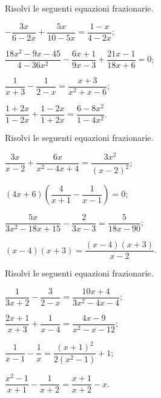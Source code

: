 \begin{esercizio}[\Ast]
\label{ese:18.8}
Risolvi le seguenti equazioni frazionarie.
\begin{multicols}{2}
\begin{enumeratea}
 \item $-{\dfrac{3x}{6-2x}}+\dfrac{5x}{10-5x}=\dfrac{1-x}{4-2x}$;
 \item $\dfrac{18x^{2}-9x-45}{4-36x^{2}}-\dfrac{6x+1}{9x-3}+\dfrac{21x-1}{18x+6}=0$;
 \item $\dfrac{1}{x+3}-\dfrac{1}{2-x}=\dfrac{x+3}{x^{2}+x-6}$;
 \item $\dfrac{1+2x}{1-2x}+\dfrac{1-2x}{1+2x}=\dfrac{6-8x^{2}}{1-4x^{2}}$.
\end{enumeratea}
\end{multicols}
\end{esercizio}

\begin{esercizio}[\Ast]
\label{ese:18.9}
Risolvi le seguenti equazioni frazionarie.
\begin{multicols}{2}
\begin{enumeratea}
 \item $\dfrac{3x}{x-2}+\dfrac{6x}{x^{2}-4x+4}=\dfrac{3x^{2}}{(x-2)^{2}}$;
 \item $(4x+6)\left(\dfrac{4}{x+1}-\dfrac{1}{x-1}\right)=0$;
 \item $\dfrac{5x}{3x^{2}-18x+15}-\dfrac{2}{3x-3}=\dfrac{5}{18x-90}$;
 \item $(x-4)(x+3)=\dfrac{(x-4)(x+3)}{x-2}$.
\end{enumeratea}
\end{multicols}
\end{esercizio}

\begin{esercizio}[\Ast]
\label{ese:18.10}
Risolvi le seguenti equazioni frazionarie.
\begin{multicols}{2}
\begin{enumeratea}
 \item $\dfrac{1}{3x+2}-\dfrac{3}{2-x}=\dfrac{10x+4}{3x^{2}-4x-4}$;
 \item $\dfrac{2x+1}{x+3}+\dfrac{1}{x-4}=\dfrac{4x-9}{x^{2}-x-12}$;
 \item $\dfrac{1}{x-1}-\dfrac{1}{x}=\dfrac{(x+1)^{2}}{2(x^{2}-1)}+1$;
 \item $\dfrac{x^{2}-1}{x+1}-\dfrac{1}{x+2}=\dfrac{x+1}{x+2}-x$.
\end{enumeratea}
\end{multicols}
\end{esercizio}

